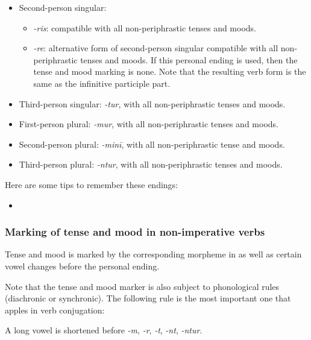 \documentclass{article}
\newcommand*{\corpus}[1]{\emph{#1}}
\begin{document}
\begin{itemize}
\begin{itemize}
        \item Second-person singular:
        \begin{itemize}
            \item \corpus{-ris}: compatible with all non-periphrastic tenses and moods.
            \item \corpus{-re}: alternative form of second-person singular compatible 
            with all non-periphrastic tenses and moods.
            If this personal ending is used, then the tense and mood marking is none.
            Note that the resulting verb form is the same as the infinitive participle part.
        \end{itemize}
        \item Third-person singular: \corpus{-tur}, with all non-periphrastic tenses and moods.
        \item First-person plural: \corpus{-mur}, with all non-periphrastic tenses and moods.
        \item Second-person plural: \corpus{-minī}, with all non-periphrastic tense and moods.
        \item Third-person plural: \corpus{-ntur}, with all non-periphrastic tenses and moods.
    \end{itemize}
\end{itemize}

Here are some tips to remember these endings:
\begin{itemize}
    \item 
\end{itemize}

\subsubsection{Marking of tense and mood in non-imperative verbs}\label{sec:tense-mood-marking}

Tense and mood is marked by the corresponding morpheme in 
as well as certain vowel changes before the personal ending.

Note that the tense and mood marker is also subject to phonological rules %
(diachronic or synchronic).
The following rule is the most important one that apples in verb conjugation:
\begin{exe}
    \ex\label{ex:vowel-shortening} 
    A long vowel is shortened before \corpus{-m}, \corpus{-r}, \corpus{-t}, \corpus{-nt}, \corpus{-ntur}.
\end{exe}
\end{document}
